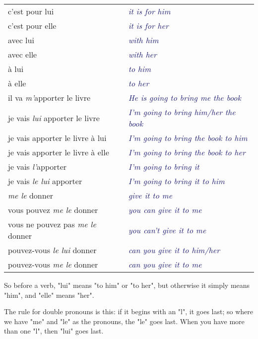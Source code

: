 \documentclass{microdoc} %
\newcommand\lEng[1]{\textcolor{MidnightBlue}{{\it #1}}}
\newcommand\lPronom[1]{\emph{\textcolor{Mulberry}{#1}}}
\begin{document}
\begin{table}[H]
    \begin{tabular}{l l}
        c'est pour lui                                  & \lEng{it is for him}\\
        c'est pour elle                                 & \lEng{it is for her}\\
        avec lui                                        & \lEng{with him}\\
        avec elle                                       & \lEng{with her}\\
        à lui                                         & \lEng{to him}\\
        à elle                                        & \lEng{to her}\\
        il va \lPronom{m'}apporter le livre             & \lEng{He is going to bring me the book}\\
        je vais \lPronom{lui} apporter le livre         & \lEng{I'm going to bring him/her the book}\\
        je vais apporter le livre à lui               & \lEng{I'm going to bring the book to him}\\
        je vais apporter le livre à elle              & \lEng{I'm going to bring the book to her}\\
        je vais \lPronom{l'}apporter                    & \lEng{I'm going to bring it}\\
        je vais \lPronom{le lui} apporter               & \lEng{I'm going to bring it to him}\\
        \lPronom{me le} donner                          & \lEng{give it to me}\\
        vous pouvez \lPronom{me le} donner              & \lEng{you can give it to me}\\
        vous ne pouvez pas \lPronom{me le} donner       & \lEng{you can't give it to me}\\
        pouvez-vous \lPronom{le lui} donner             & \lEng{can you give it to him/her}\\
        pouvez-vous \lPronom{me le} donner              & \lEng{can you give it to me}\\
    \end{tabular}
\end{table}

So before a verb, "lui" means "to him" or "to her", but otherwise it simply means "him", and "elle" means "her".

The rule for double pronouns is this: if it begins with an "l", it goes last; so where we have "me" and "le"
as the pronouns, the "le" goes last.  When you have more than one "l", then "lui" goes last.
\end{document}
